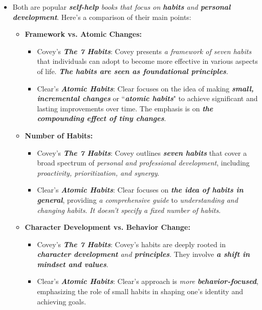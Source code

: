 \documentclass[11pt]{article}
\begin{document}
\begin{itemize}
\item Both are popular \emph{\textbf{self-help} books that focus on \textbf{habits} and \textbf{personal development}}. Here's a comparison of their main points:

\begin{itemize}
\item \textbf{Framework vs. Atomic Changes:}
\begin{itemize}
\item Covey's \emph{\textbf{The 7 Habits}}: Covey presents \emph{a framework of seven habits} that individuals can adopt to become more effective in various aspects of life. \emph{\textbf{The habits are seen as foundational principles}}.
\item Clear's \emph{\textbf{Atomic Habits}}: Clear focuses on the idea of making \emph{\textbf{small, incremental changes}} or ``\emph{\textbf{atomic habits}}" to achieve significant and lasting improvements over time. The emphasis is on \emph{\textbf{the compounding effect of tiny changes}}.
\end{itemize}

\item \textbf{Number of Habits:}
\begin{itemize}
\item Covey's \emph{\textbf{The 7 Habits}}: Covey outlines \emph{\textbf{seven habits}} that cover a broad spectrum of \emph{personal and professional development}, including \emph{proactivity, prioritization, and synergy}.
\item Clear's \emph{\textbf{Atomic Habits}}: Clear focuses on \emph{\textbf{the idea of habits in general}}, providing \emph{a comprehensive guide} to \emph{understanding and changing habits}. \emph{It doesn't specify a fixed number of habits}.
\end{itemize}

\item \textbf{Character Development vs. Behavior Change:}
\begin{itemize}
\item Covey's \emph{\textbf{The 7 Habits}}: Covey's habits are deeply rooted in \emph{\textbf{character development} and \textbf{principles}}. They involve \emph{\textbf{a shift in mindset and values}}.
\item Clear's \emph{\textbf{Atomic Habits}}: Clear's approach is \emph{more \textbf{behavior-focused}}, emphasizing the role of small habits in shaping one's identity and achieving goals.
\end{itemize}


\end{itemize}
\end{itemize}
\end{document}
